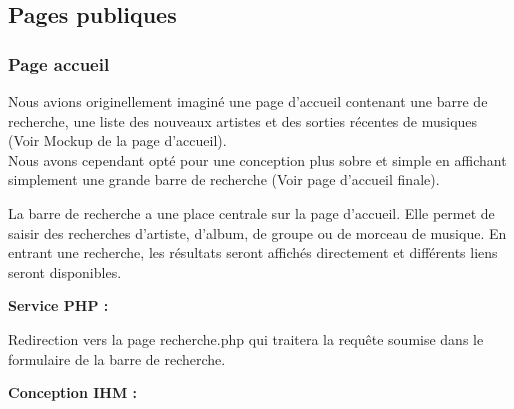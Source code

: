 \newpage


    \clearpage

    \subsection{Pages publiques}

		\subsubsection{Page accueil}

            \begin{paragraphe}
                Nous avions originellement imaginé une page d'accueil contenant une barre de recherche, une liste des nouveaux artistes et des sorties récentes de musiques (Voir Mockup de la page d'accueil).\\
                Nous avons cependant opté pour une conception plus sobre et simple en affichant simplement une grande barre de recherche (Voir page d'accueil finale).
            \end{paragraphe}

			\begin{paragraphe}
                La barre de recherche a une place centrale sur la page d'accueil. Elle permet de saisir des recherches d’artiste, d’album, de groupe ou de morceau de musique.
				En entrant une recherche, les résultats seront affichés directement et différents liens seront disponibles.
			\end{paragraphe}

			\begin{paragraphe}
				\textbf{Service PHP :}
            \end{paragraphe}

            \begin{paragraphe}
                Redirection vers la page recherche.php qui traitera la requête soumise dans le formulaire de la barre de recherche.
			\end{paragraphe}

			\begin{paragraphe}
				\textbf{Conception IHM :}
            \end{paragraphe}


